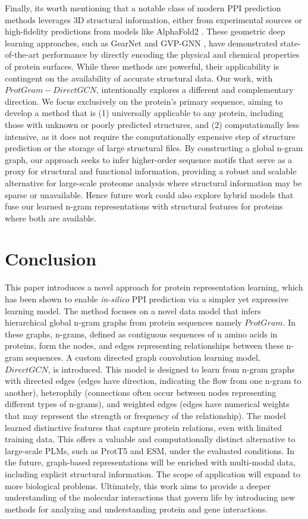 \documentclass[utf8]{article}
\begin{document}
	Finally,  its worth mentioning that a notable class of modern PPI prediction methods leverages 3D structural information, either from experimental sources or high-fidelity predictions from models like AlphaFold2 \cite{jumper_highlyaccurateprotein_2021}. These geometric deep learning approaches, such as GearNet and GVP-GNN , have demonstrated state-of-the-art performance by directly encoding the physical and chemical properties of protein surfaces. While these methods are powerful, their applicability is contingent on the availability of accurate structural data. Our work, with $ProtGram-DirectGCN$, intentionally explores a different and complementary direction. We focus exclusively on the protein's primary sequence, aiming to develop a method that is (1) universally applicable to any protein, including those with unknown or poorly predicted structures, and (2) computationally less intensive, as it does not require the computationally expensive step of structure prediction or the storage of large structural files. By constructing a global n-gram graph, our approach seeks to infer higher-order sequence motifs that serve as a proxy for structural and functional information, providing a robust and scalable alternative for large-scale proteome analysis where structural information may be sparse or unavailable. Hence future work could also explore hybrid models that fuse our learned n-gram representations with structural features for proteins where both are available.
	
	\section{Conclusion}
	This paper introduces a novel approach for protein representation learning, which has been shown to enable \textit{in-silico} PPI prediction via a simpler yet expressive learning model. The method focuses on a novel data model that infers hierarchical global n-gram graphs from protein sequences namely $ProtGram$. In these graphs, n-grams, defined as contiguous sequences of n amino acids in proteins, form the nodes, and edges representing relationships between these n-gram sequences. A custom directed graph convolution learning model, $DirectGCN$, is introduced. This model is designed to learn from n-gram graphs with directed edges (edges have direction, indicating the flow from one n-gram to another), heterophily (connections often occur between nodes representing different types of n-grams), and weighted edges (edges have numerical weights that may represent the strength or frequency of the relationship). The model learned distinctive features that capture protein relations, even with limited training data. This offers a valuable and computationally distinct alternative to large-scale PLMs, such as ProtT5 and ESM, under the evaluated conditions. In the future, graph-based representations will be enriched with multi-modal data, including explicit structural information. The scope of application will expand to more biological problems. Ultimately, this work aims to provide a deeper understanding of the molecular interactions that govern life by introducing new methods for analyzing and understanding protein and gene interactions.
	
\end{document}
